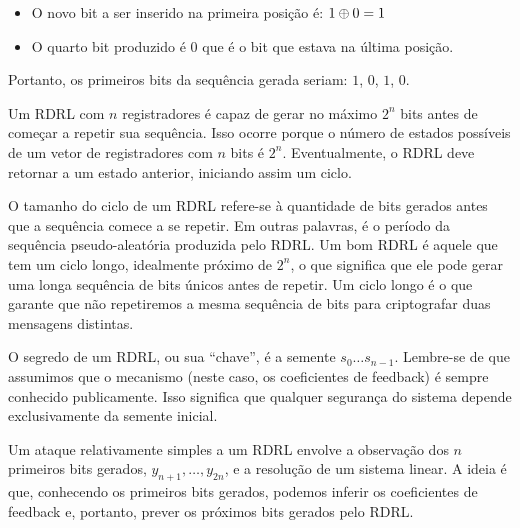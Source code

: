 \begin{example}
\begin{center}
\end{center}

\begin{itemize}
\item[] O novo bit a ser inserido na primeira posição é: $1 \oplus 0 = 1$
\item[] O quarto bit produzido é $0$ que é o bit que estava na última posição.
\end{itemize}

Portanto, os primeiros bits da sequência gerada seriam: $1$, $0$, $1$, $0$.

\end{example}

Um RDRL com $n$ registradores é capaz de gerar no máximo $2^n$ bits antes de começar a repetir sua sequência.
Isso ocorre porque o número de estados possíveis de um vetor de registradores com $n$ bits é $2^n$.
Eventualmente, o RDRL deve retornar a um estado anterior, iniciando assim um ciclo.

O tamanho do ciclo de um RDRL refere-se à quantidade de bits gerados antes que a sequência comece a se repetir.
Em outras palavras, é o período da sequência pseudo-aleatória produzida pelo RDRL.
Um bom RDRL é aquele que tem um ciclo longo, idealmente próximo de $2^n$, o que significa que ele pode gerar uma longa sequência de bits únicos antes de repetir.
Um ciclo longo é o que garante que não repetiremos a mesma sequência de bits para criptografar duas mensagens distintas.

O segredo de um RDRL, ou sua ``chave'', é a semente $s_0 \dots s_{n-1}$.
Lembre-se de que assumimos que o mecanismo (neste caso, os coeficientes de feedback) é sempre conhecido publicamente. Isso significa que qualquer segurança do sistema depende exclusivamente da semente inicial.

Um ataque relativamente simples a um RDRL envolve a observação dos $n$ primeiros bits gerados, \(y_{n+1}, \dots, y_{2n}\), e a resolução de um sistema linear.
A ideia é que, conhecendo os primeiros bits gerados, podemos inferir os coeficientes de feedback e, portanto, prever os próximos bits gerados pelo RDRL.

